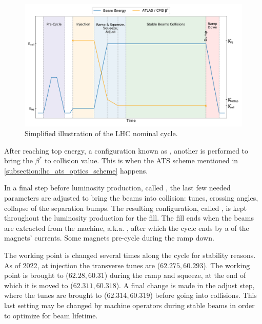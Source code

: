 \begin{figure}[!hbt]
  \centering
  \includegraphics*[width=0.99\linewidth]{Figures/Optics_Measurements_Corrections_at_LHC/lhc_cycle.pdf}
  \caption{Simplified illustration of the LHC nominal cycle.}
  \label{figure:lhc_cycle}
\end{figure}

After reaching top energy, a configuration known as , another  is performed to bring the \(\beta^{\ast}\) to collision value.
This is when the \acrshort{ATS} scheme mentioned in \cref{subsection:lhc_ats_optics_scheme} happens.

In a final step before luminosity production, called , the last few needed parameters are adjusted to bring the beams into collision: tunes, crossing angles, collapse of the separation bumps.
The resulting configuration, called , is kept throughout the luminosity production for the fill.
The fill ends when the beams are extracted from the machine, a.k.a. , after which the cycle ends by a  of the magnets' currents.
Some magnets pre-cycle during the ramp down.

The working point is changed several times along the cycle for stability reasons.
As of \num{2022}, at injection the transverse tunes are (\(62.275, 60.293\)).
The working point is brought to (\(62.28, 60.31\)) during the ramp and squeeze, at the end of which it is moved to (\(62.311, 60.318\)).
A final change is made in the adjust step, where the tunes are brought to (\(62.314, 60.319\)) before going into collisions.
This last setting may be changed by machine operators during stable beams in order to optimize for beam lifetime.

